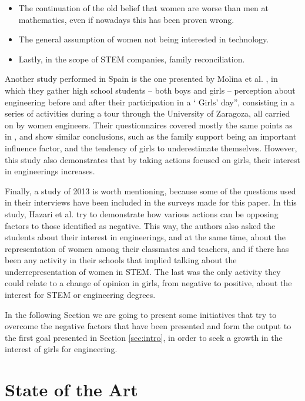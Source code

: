 \documentclass[journal,transmag]{IEEEtran}
\begin{document}
\begin{itemize}
	\item The continuation of the old belief that women are worse than men at mathematics, even if nowadays this has been proven wrong.
	\item The general assumption of women not being interested in technology.
	\item Lastly, in the scope of STEM companies, family reconciliation.
\end{itemize}

Another study performed in Spain is the one presented by Molina et al. \cite{molina2010perception}, in which they gather high school students -- both boys and girls -- perception about engineering before and after their participation in a ` Girls' day'', consisting in a series of activities during a tour through the University of Zaragoza, all carried on by women engineers. Their questionnaires covered mostly the same points as in \cite{everis2012}, and show similar conclusions, such as the family support being an important influence factor, and the tendency of girls to underestimate themselves. However, this study also demonstrates that by taking actions focused on girls, their interest in engineerings increases.

Finally, a study of 2013 \cite{hazari2013factors} is worth mentioning, because some of the questions used in their interviews have been included in the surveys made for this paper. In this study, Hazari et al. try to demonstrate how various actions can be opposing factors to those identified as negative. This way, the authors also asked the students about their interest in engineerings, and at the same time, about the representation of women among their classmates and teachers, and if there has been any activity in their schools that implied talking about the underrepresentation of women in STEM. The last was the only activity they could relate to a change of opinion in girls, from negative to positive, about the interest for STEM or engineering degrees.

In the following Section we are going to present some initiatives that try to overcome the negative factors that have been presented and form the output to the first goal presented in Section \ref{sec:intro}, in order to seek a growth in the interest of girls for engineering.

\section{State of the Art}
\label{sec:EdA}
\end{document}
